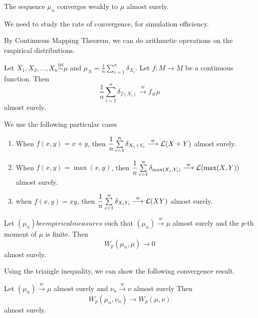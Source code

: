 \begin{theorem}[Varadarajan]
  The sequence $\mu_n$ converges weakly to $\mu$ almost surely.
\end{theorem}

\begin{remark}
  We need to study the rate of convergence, for simulation efficiency.
\end{remark}

By Continuous Mapping Theorem, we can do arithmetic operations on the empirical distributions.

\begin{proposition}
  Let $X_1, X_2, \ldots, X_n \overset{\text{iid}}{\sim} \mu$ and $\mu_N = \frac{1}{n} \sum_{i=1}^n \delta_{X_i}$. Let $f: M \to M$ be a continuous function. Then
  $$\dfrac{1}{n}\sum\limits_{i=1}^n \delta_{f(X_i)} \stackrel{w}{\longrightarrow} f_{\#}\mu$$
  almost surely.
\end{proposition}

We use the following particular cases

\begin{enumerate}
  \item When $f(x,y) = x + y$, then
        $\dfrac{1}{n}\sum\limits_{i=1}^n \delta_{X_i + Y_i} \stackrel{w}{\longrightarrow} \mathcal{L}(X+Y)$
        almost surely.
  \item When $f(x,y) = \max(x,y)$, then
        $\dfrac{1}{n}\sum\limits_{i=1}^n \delta_{\max(X_i, Y_i)} \stackrel{w}{\longrightarrow} \mathcal{L}(\max(X,Y))$
        almost surely.
  \item when $f(x,y) = xy$, then
        $\dfrac{1}{n}\sum\limits_{i=1}^n \delta_{X_i Y_i} \stackrel{w}{\longrightarrow} \mathcal{L}(XY)$
        almost surely.
\end{enumerate}

\begin{proposition}
  Let $(\mu_n) be empirical measures$ such that $(\mu_n) \stackrel{w}{\longrightarrow} \mu$ almost surely and the $p$-th moment of $\mu$ is finite. Then
  $$W_p(\mu_n, \mu) \to 0$$
  almost surely.
\end{proposition}

Using the triangle inequality, we can show the following convergence result.

\begin{proposition}
  \label{prop:Wasserstein_convergence}
  Let $(\mu_n) \stackrel{w}{\longrightarrow} \mu$ almost surely and $\nu_n \stackrel{w}{\longrightarrow} \nu$ almost surely Then
  $$W_p(\mu_n, \nu_n) \to W_p(\mu, \nu)$$
  almost surely.
\end{proposition}

